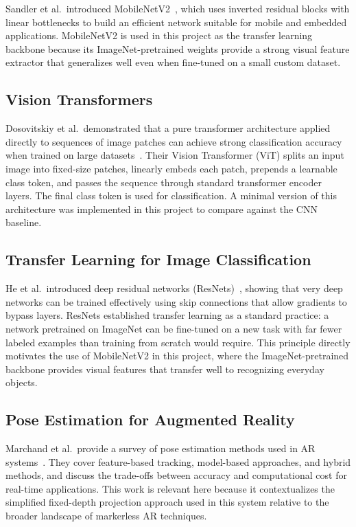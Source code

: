 \documentclass[conference]{IEEEtran}
\begin{document}
Sandler et al.\ introduced MobileNetV2~\cite{sandler2018mobilenetv2}, which
uses inverted residual blocks with linear bottlenecks to build an efficient
network suitable for mobile and embedded applications. MobileNetV2 is used in
this project as the transfer learning backbone because its ImageNet-pretrained
weights provide a strong visual feature extractor that generalizes well even
when fine-tuned on a small custom dataset.

\subsection{Vision Transformers}

Dosovitskiy et al.\ demonstrated that a pure transformer architecture applied
directly to sequences of image patches can achieve strong classification
accuracy when trained on large datasets~\cite{dosovitskiy2021image}. Their
Vision Transformer (ViT) splits an input image into fixed-size patches,
linearly embeds each patch, prepends a learnable class token, and passes the
sequence through standard transformer encoder layers. The final class token
is used for classification. A minimal version of this architecture was
implemented in this project to compare against the CNN baseline.

\subsection{Transfer Learning for Image Classification}

He et al.\ introduced deep residual networks (ResNets)~\cite{he2016deep},
showing that very deep networks can be trained effectively using skip
connections that allow gradients to bypass layers. ResNets established
transfer learning as a standard practice: a network pretrained on ImageNet can
be fine-tuned on a new task with far fewer labeled examples than training from
scratch would require. This principle directly motivates the use of MobileNetV2
in this project, where the ImageNet-pretrained backbone provides visual
features that transfer well to recognizing everyday objects.

\subsection{Pose Estimation for Augmented Reality}

Marchand et al.\ provide a survey of pose estimation methods used in AR
systems~\cite{marchand2016pose}. They cover feature-based tracking, model-based
approaches, and hybrid methods, and discuss the trade-offs between accuracy
and computational cost for real-time applications. This work is relevant here
because it contextualizes the simplified fixed-depth projection approach used
in this system relative to the broader landscape of markerless AR techniques.
\end{document}
